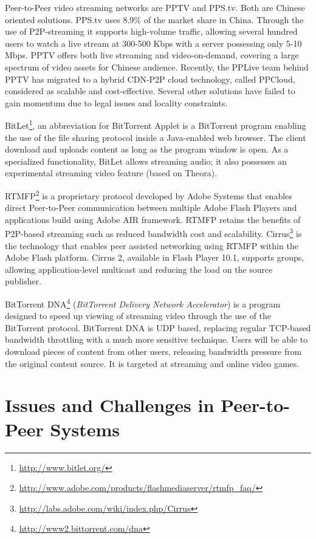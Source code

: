 Peer-to-Peer video streaming networks are PPTV and PPS.tv. Both are Chinese
oriented solutions. PPS.tv uses 8.9\% of the market share in China. Through
the use of P2P-streaming it supports high-volume traffic, allowing several
hundred users to watch a live stream at 300-500 Kbps with a server possessing
only 5-10 Mbps. PPTV offers both live streaming and video-on-demand, covering
a large spectrum of video assets for Chinese audience. Recently, the PPLive
team behind PPTV has migrated to a hybrid CDN-P2P cloud technology, called
PPCloud, considered as scalable and cost-effective. Several other solutions
have failed to gain momentum due to legal issues and locality constraints.

BitLet\footnote{\url{http://www.bitlet.org/}}, an abbreviation for BitTorrent Applet
is a BitTorrent program enabling the use of the file sharing protocol inside a
Java-enabled web browser. The client download and uploads content as long as
the program window is open. As a specialized functionality, BitLet allows
streaming audio; it also possesses an experimental streaming video feature
(based on Theora).

RTMFP\footnote{\url{http://www.adobe.com/products/flashmediaserver/rtmfp_faq/}} is a
proprietary protocol developed by Adobe Systems that enables direct
Peer-to-Peer communication between multiple Adobe Flash Players and
applications build using Adobe AIR framework. RTMFP retains the benefits of
P2P-based streaming such as reduced bandwidth cost and scalability.
Cirrus\footnote{\url{http://labs.adobe.com/wiki/index.php/Cirrus}} is the technology
that enables peer assisted networking using RTMFP within the Adobe Flash
platform. Cirrus 2, available in Flash Player 10.1, supports groups, allowing
application-level multicast and reducing the load on the source publisher.

BitTorrent DNA\footnote{\url{http://www2.bittorrent.com/dna}} (\textit{BitTorrent
Delivery Network Accelerator}) is a program designed to speed up viewing of
streaming video through the use of the BitTorrent protocol. BitTorrent DNA is
UDP based, replacing regular TCP-based bandwidth throttling with a much more
sensitive technique. Users will be able to download pieces of content from
other users, releasing bandwidth pressure from the original content source. It
is targeted at streaming and online video games.

\section{Issues and Challenges in Peer-to-Peer Systems}
\label{sec:p2p-systems:issues}

